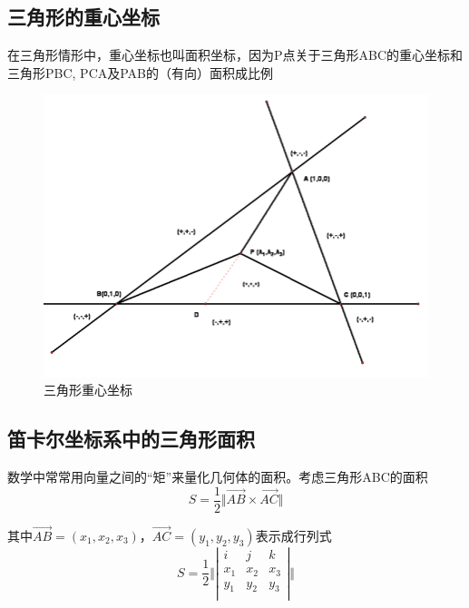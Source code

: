 \subsection*{三角形的重心坐标}

在三角形情形中，重心坐标也叫面积坐标，因为P点关于三角形ABC的重心坐标和三角形PBC, PCA及PAB的（有向）面积成比例

\begin{figure}[H]
    \centering
    \includegraphics[scale=0.35]{figures/三角形重心坐标.png}
    \caption{三角形重心坐标}
\end{figure}

\subsection*{笛卡尔坐标系中的三角形面积}

数学中常常用向量之间的“矩”来量化几何体的面积。考虑三角形ABC的面积
\begin{equation}
    S=\frac{1}{2}\Vert\overrightarrow{AB}\times\overrightarrow{AC}\Vert
\end{equation}

其中$\overrightarrow{AB}=(x_1,x_2,x_3)$，$\overrightarrow{AC}=(y_1,y_2,y_3)$表示成行列式
\begin{equation}
    S=\frac{1}{2}\Vert\left|
        \begin{array}{ccc}
            i   &   j   & k  \\
            x_1 &  x_2  & x_3\\
            y_1 &  y_2  & y_3\\
        \end{array}
    \right|\Vert
\end{equation}

